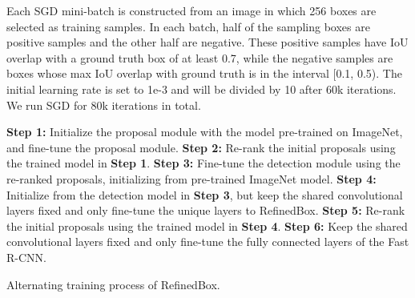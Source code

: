 \documentclass[10pt,twocolumn,letterpaper]{article}
\begin{document}
Each SGD mini-batch is constructed from an image in which 256 boxes are selected
as training samples.
In each batch, half of the sampling boxes are positive samples and the other half
are negative.
These positive samples have IoU overlap with a ground truth box of at least 0.7,
while the negative samples are boxes whose max IoU overlap with ground truth
is in the interval [0.1, 0.5).
The initial learning rate is set to 1e-3 and will be divided by 10 after
60k iterations.
We run SGD for 80k iterations in total.


\begin{algorithm}[!tb]
\begin{algorithmic}
	\STATE \textbf{Step 1:} Initialize the proposal module with the model pre-trained
    	on ImageNet, and fine-tune the proposal module.
    \STATE \textbf{Step 2:} Re-rank the initial proposals using the trained model in
    	\textbf{Step 1}.
    \STATE \textbf{Step 3:} Fine-tune the detection module using the re-ranked proposals,
    	initializing from pre-trained ImageNet model.
    \STATE \textbf{Step 4:} Initialize from the detection model in \textbf{Step 3},
    	but keep the shared convolutional layers fixed and only fine-tune the unique
        layers to RefinedBox.
    \STATE \textbf{Step 5:} Re-rank the initial proposals using the trained model in
    	\textbf{Step 4}.
    \STATE \textbf{Step 6:} Keep the shared convolutional layers fixed and only
    	fine-tune the fully connected layers of the Fast R-CNN.
\end{algorithmic}
\caption{Alternating training process of RefinedBox.}
\label{alg:training}
\end{algorithm}
\end{document}
